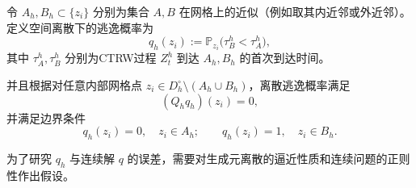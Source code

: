 	
	
	令 \(A_h,B_h\subset\{z_i\}\) 分别为集合 \(A,B\) 在网格上的近似（例如取其内近邻或外近邻）。定义空间离散下的逃逸概率为
	\[
	q_h(z_i) := \mathbb{P}_{z_i}\big(\tau_B^h < \tau_A^h\big),
	\]
	其中 \(\tau_A^h,\tau_B^h\) 分别为CTRW过程 \(Z_t^h\) 到达 \(A_h,B_h\) 的首次到达时间。
	
	并且根据\cite{bou2018continuous}对任意内部网格点 \(z_i\in D_h^\circ\setminus(A_h\cup B_h)\)，离散逃逸概率满足
		\begin{equation}\label{eq:disc-harmonic}
			(Q_h q_h)(z_i) = 0,
		\end{equation}
		并满足边界条件
		\begin{equation}\label{eq:disc-bc}
			q_h(z_i) = 0,\quad z_i\in A_h;\qquad
			q_h(z_i) = 1,\quad z_i\in B_h.
		\end{equation}
	
	为了研究 \(q_h\) 与连续解 \(q\) 的误差，需要对生成元离散的逼近性质和连续问题的正则性作出假设。
	
